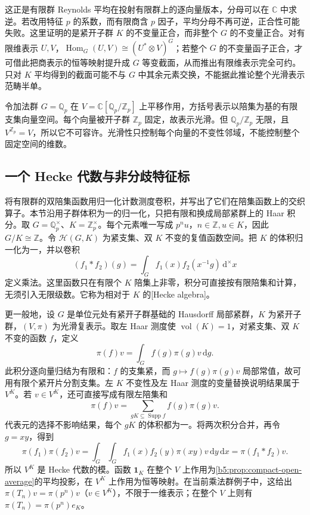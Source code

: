 这正是有限群 Reynolds 平均在投射有限群上的逐向量版本，分母可以在 \(\mathbb C\) 中求逆。若改用特征 \(p\) 的系数，而有限商含 \(p\) 因子，平均分母不再可逆，正合性可能失败。这里证明的是紧开子群 \(K\) 的不变量正合，而非整个 \(G\) 的不变量正合。对有限维表示 \(U,V\)，\(\operatorname{Hom}_G(U,V)\cong(U^*\otimes V)^G\)；若整个 \(G\) 的不变量函子正合，才可借此把商表示的恒等映射提升成 \(G\) 等变截面，从而推出有限维表示完全可约。只对 \(K\) 平均得到的截面可能不与 \(G\) 中其余元素交换，不能据此推论整个光滑表示范畴半单。

\begin{example}\label{b5:exm:smooth-not-admissible}
	令加法群 \(G=\mathbb Q_p\) 在 \(V=\mathbb C[\mathbb Q_p/\mathbb Z_p]\) 上平移作用，方括号表示以陪集为基的有限支集向量空间。每个向量被开子群 \(\mathbb Z_p\) 固定，故表示光滑。但 \(\mathbb Q_p/\mathbb Z_p\) 无限，且 \(V^{\mathbb Z_p}=V\)，所以它不可容许。光滑性只控制每个向量的不变性邻域，不能控制整个固定空间的维数。
\end{example}

\subsection{一个 Hecke 代数与非分歧特征标}
\label{b5:subsec:C03:03}

将有限群的双陪集函数用归一化计数测度卷积，并写出了它们在陪集函数上的交织算子。本节沿用子群体积为一的归一化，只把有限和换成局部紧群上的 Haar 积分。取 \(G=\mathbb Q_p^\times\)、\(K=\mathbb Z_p^\times\)。每个元素唯一写成 \(p^nu\)，\(n\in\mathbb Z,u\in K\)，因此 \(G/K\cong\mathbb Z\)。令 \(\mathcal H(G,K)\) 为紧支集、双 \(K\) 不变的复值函数空间。把 \(K\) 的体积归一化为一，并以卷积
\[
	(f_1*f_2)(g)=\int_G f_1(x)f_2(x^{-1}g)\,\mathrm{d}^\times x
\]
定义乘法。这里函数只在有限个 \(K\) 陪集上非零，积分可直接按有限陪集和计算，无须引入无限级数。它称为相对于 \(K\) 的[Hecke algebra]。

\ProseParagraphBreak
更一般地，设 \(G\) 是单位元处有紧开子群基础的 Hausdorff 局部紧群，\(K\) 为紧开子群，\((V,\pi)\) 为光滑复表示。取左 Haar 测度使 \(\operatorname{vol}(K)=1\)，对紧支集、双 \(K\) 不变的函数 \(f\)，定义
\[
	\pi(f)v=\int_G f(g)\pi(g)v\,\mathrm{d}g.
\]
此积分逐向量归结为有限和：\(f\) 的支集紧，而 \(g\mapsto f(g)\pi(g)v\) 局部常值，故可用有限个紧开片分割支集。左 \(K\) 不变性及左 Haar 测度的变量替换说明结果属于 \(V^K\)。若 \(v\in V^K\)，还可直接写成有限左陪集和
\[
	\pi(f)v=\sum_{gK\subseteq\operatorname{Supp}f}f(g)\pi(g)v.
\]
代表元的选择不影响结果，每个 \(gK\) 的体积都为一。将两次积分合并，再令 \(g=xy\)，得到
\[
	\pi(f_1)\pi(f_2)v =\int_G\int_G f_1(x)f_2(y)\pi(xy)v\,\mathrm{d}y\,\mathrm{d}x =\pi(f_1*f_2)v.
\]
所以 \(V^K\) 是 Hecke 代数的模。函数 \(\mathbf1_K\) 在整个 \(V\) 上作用为\cref{b5:prop:compact-open-average}的平均投影，在 \(V^K\) 上作用为恒等映射。在当前乘法群例子中，这给出 \(\pi(T_n)v=\pi(p^n)v\)（\(v\in V^K\)），不限于一维表示；在整个 \(V\) 上则有 \(\pi(T_n)=\pi(p^n)e_K\)。

